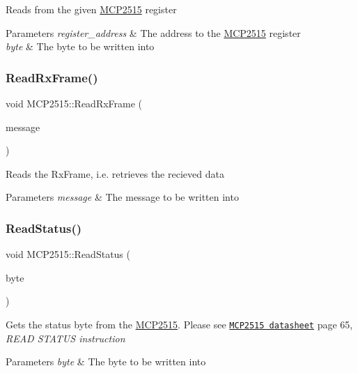 Reads from the given \hyperlink{class_m_c_p2515}{M\+C\+P2515} register 
\begin{DoxyParams}{Parameters}
{\em register\+\_\+address} & The address to the \hyperlink{class_m_c_p2515}{M\+C\+P2515} register \\
\hline
{\em byte} & The byte to be written into \\
\hline
\end{DoxyParams}
\hypertarget{class_m_c_p2515_a2035c6707e66a98d92003a3fc99aa784}{}\label{class_m_c_p2515_a2035c6707e66a98d92003a3fc99aa784} 
\subsubsection{\texorpdfstring{Read\+Rx\+Frame()}{ReadRxFrame()}}
{\footnotesize\ttfamily void M\+C\+P2515\+::\+Read\+Rx\+Frame (\begin{DoxyParamCaption}\item[{\hyperlink{struct_c_a_n___m_e_s_s_a_g_e}{C\+A\+N\+\_\+\+M\+E\+S\+S\+A\+GE} \&}]{message }\end{DoxyParamCaption})\hspace{0.3cm}{\ttfamily [private]}}

Reads the Rx\+Frame, i.\+e. retrieves the recieved data 
\begin{DoxyParams}{Parameters}
{\em message} & The message to be written into \\
\hline
\end{DoxyParams}
\hypertarget{class_m_c_p2515_ae466f10eea5ccf0f36439757d4baf6b5}{}\label{class_m_c_p2515_ae466f10eea5ccf0f36439757d4baf6b5} 
\subsubsection{\texorpdfstring{Read\+Status()}{ReadStatus()}}
{\footnotesize\ttfamily void M\+C\+P2515\+::\+Read\+Status (\begin{DoxyParamCaption}\item[{uint8\+\_\+t \&}]{byte }\end{DoxyParamCaption})\hspace{0.3cm}{\ttfamily [private]}}

Gets the status byte from the \hyperlink{class_m_c_p2515}{M\+C\+P2515}. Please see \href{http://ww1.microchip.com/downloads/en/DeviceDoc/21801G.pdf}{\tt M\+C\+P2515 datasheet} page 65, {\itshape R\+E\+AD S\+T\+A\+T\+US instruction} 
\begin{DoxyParams}{Parameters}
{\em byte} & The byte to be written into \\
\hline
\end{DoxyParams}
\hypertarget{class_m_c_p2515_a5a218199ca1dfcb25cb95890bc0220fc}{}\label{class_m_c_p2515_a5a218199ca1dfcb25cb95890bc0220fc} 
